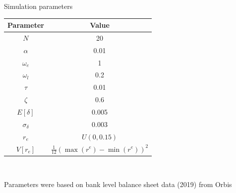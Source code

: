 \documentclass{beamer}
\begin{document}
\begin{frame}{Simulation parameters}

    \begin{table}
    \begin{center}
        \begin{tabular}{|c c|} 
         \hline
         Parameter & Value\\ [0.3ex] 
         \hline\hline
         $N$ & 20 \\ 
         \hline
         $\alpha$ & 0.01 \\
         \hline
         $\omega_e$ & 1 \\
         \hline
         $\omega_l$ & 0.2\\
         \hline
         $\tau$ & 0.01 \\ 
         \hline
         $\zeta$ & 0.6 \\ 
         \hline
         $E[\delta]$ & 0.005 \\
         \hline
         $\sigma_\delta$ & 0.003 \\ 
         \hline
         $r_e$ & $U(0, 0.15)$ \\ 
         \hline
         $V[r_e]$ & $\frac{1}{12}(\max(r^e) - \min(r^e))^2$ \\  [1ex] 
         \hline
        \end{tabular}
    \end{center}

    \

    Parameters were based on bank level balance sheet data (2019) from Orbis

\end{table}
    

\end{frame}
\end{document}
